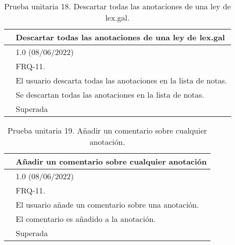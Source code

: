 \begin{table}[H]
\begin{center}
\begin{tabular}{|p{3cm}|p{10cm}|} \hline
\centering {\bf PU-18} & Descartar todas las anotaciones de una ley de lex.gal  \\ \hline\hline
\centering {\bf Versión} & 1.0 (08/06/2022) \\ \hline
\centering {\bf Dependencias} & FRQ-11. \\ \hline
\centering {\bf Descripción} &  El usuario descarta todas las anotaciones en la lista de notas. \\ \hline
\centering {\bf Criterio de aceptación} & Se descartan todas las anotaciones en la lista de notas. \\ \hline
\centering {\bf Estado} & Superada \\ \hline
\end{tabular}
\caption{Prueba unitaria 18. Descartar todas las anotaciones de una ley de lex.gal.}
\label{enlacePU18}
\end{center}
\end{table}

\begin{table}[H]
\begin{center}
\begin{tabular}{|p{3cm}|p{10cm}|} \hline
\centering {\bf PU-19} & Añadir un comentario sobre cualquier anotación  \\ \hline\hline
\centering {\bf Versión} & 1.0 (08/06/2022) \\ \hline
\centering {\bf Dependencias} & FRQ-11. \\ \hline
\centering {\bf Descripción} &  El usuario añade un comentario sobre una anotación. \\ \hline
\centering {\bf Criterio de aceptación} & El comentario es añadido a la anotación. \\ \hline
\centering {\bf Estado} & Superada \\ \hline
\end{tabular}
\caption{Prueba unitaria 19. Añadir un comentario sobre cualquier anotación.}
\label{enlacePU19}
\end{center}
\end{table}

